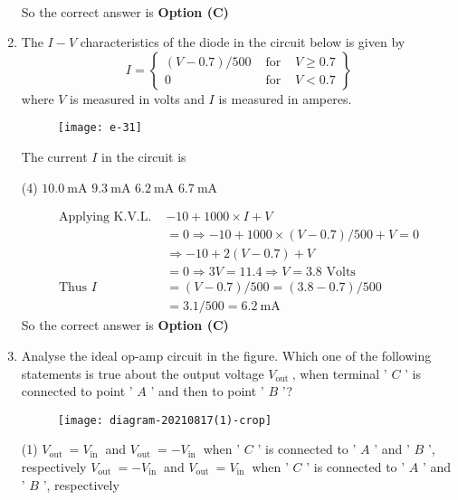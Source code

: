 \begin{enumerate}
\begin{answer}
\begin{align*}
\end{align*}
So the correct answer is \textbf{Option (C)}
\end{answer}
	\item The $I-V$ characteristics of the diode in the circuit below is given by
	$$
	I=\left\{\begin{array}{rll}
	(V-0.7) / 500 & \text { for } & V \geq 0.7 \\
	0 & \text { for } & V<0.7
	\end{array}\right\}
	$$
	where $V$ is measured in volts and $I$ is measured in amperes.\\
	\begin{figure}[H]
		\centering
		\texttt{[image: e-31]}
	\end{figure}
	The current $I$ in the circuit is
\begin{tasks}(4)
\task[\textbf{A.}] $10.0 \mathrm{~mA}$
\task[\textbf{B.}] $9.3 \mathrm{~mA}$
\task[\textbf{C.}] $6.2 \mathrm{~mA}$
\task[\textbf{D.}] $6.7 \mathrm{~mA}$
\end{tasks}
\begin{answer}
\begin{align*}
\text{Applying K.V.L. }&-10+1000 \times I+V\\&=0 \Rightarrow-10+1000 \times(V-0.7) / 500+V=0\\
&\Rightarrow-10+2(V-0.7)+V\\&=0 \Rightarrow 3 V=11.4 \Rightarrow V=3.8\text{ Volts}\\
\text{Thus }I&=(V-0.7) / 500=(3.8-0.7) / 500\\&=3.1 / 500=6.2 \mathrm{~mA}
\end{align*}
So the correct answer is \textbf{Option (C)}
\end{answer}
	\item Analyse the ideal op-amp circuit in the figure. Which one of the following statements is true about the output voltage $V_{\text {out }}$, when terminal ' $C$ ' is connected to point ' $A$ ' and then to point ' $B$ '?
\begin{figure}[H]
\centering
\texttt{[image: diagram-20210817(1)-crop]}
\end{figure}
\begin{tasks}(1)
\task[\textbf{A.}] $V_{\text {out }}=V_{\text {in }}$ and $V_{\text {out }}=-V_{\text {in }}$ when ' $C$ ' is connected to ' $A$ ' and ' $B$ ', respectively
\task[\textbf{B.}] $V_{\text {out }}=-V_{\text {in }}$ and $V_{\text {out }}=V_{\text {in }}$ when ' $C$ ' is connected to ' $A$ ' and ' $B$ ', respectively

\end{tasks}
\end{enumerate}
